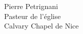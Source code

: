 
{\itshape

\lipsum

\begin{flushright}
Pierre Petrignani\\
Pasteur de l'église\\
Calvary Chapel de Nice
\end{flushright}

}


